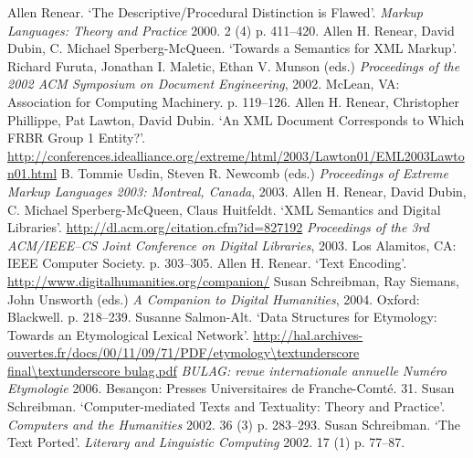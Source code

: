 \begin{bibitemlist}{1}
\label{Renear2000}Allen Renear. ‘The Descriptive/Procedural Distinction is Flawed’. \textit{Markup Languages: Theory and Practice} 2000. 2  (4)  p. 411–420. 
\label{Renearetal2002}Allen H. Renear, David Dubin, C. Michael Sperberg-McQueen. ‘Towards a Semantics for XML Markup’.  Richard Furuta, Jonathan I. Maletic, Ethan V. Munson (eds.) \textit{Proceedings of the 2002 ACM Symposium on Document Engineering}, 2002. McLean, VA: Association for Computing Machinery. p. 119–126. 
\label{Renearetal2003a}Allen H. Renear, Christopher Phillippe, Pat Lawton, David Dubin. ‘An XML Document Corresponds to Which FRBR Group 1 Entity?’.  \url{http://conferences.idealliance.org/extreme/html/2003/Lawton01/EML2003Lawton01.html} B. Tommie Usdin, Steven R. Newcomb (eds.) \textit{Proceedings of Extreme Markup Languages 2003: Montreal, Canada}, 2003. 
\label{Renearetal2003b}Allen H. Renear, David Dubin, C. Michael Sperberg-McQueen, Claus Huitfeldt. ‘XML Semantics and Digital Libraries’.  \url{http://dl.acm.org/citation.cfm?id=827192} \textit{Proceedings of the 3rd ACM/IEEE–CS Joint Conference on Digital Libraries}, 2003. Los Alamitos, CA: IEEE Computer Society. p. 303–305. 
\label{Renear2004}Allen H. Renear. ‘Text Encoding’.  \url{http://www.digitalhumanities.org/companion/} Susan Schreibman, Ray Siemans, John Unsworth (eds.) \textit{A Companion to Digital Humanities}, 2004. Oxford: Blackwell. p. 218–239. 
\label{SalmonAlt2006}Susanne Salmon-Alt. ‘Data Structures for Etymology: Towards an Etymological Lexical Network’.  \url{http://hal.archives-ouvertes.fr/docs/00/11/09/71/PDF/etymology\textunderscore final\textunderscore bulag.pdf} \textit{BULAG: revue internationale annuelle} \textit{Numéro Etymologie} 2006. Besançon: Presses Universitaires de Franche-Comté. 31. 
\label{Schreibman2002a}Susan Schreibman. ‘Computer-mediated Texts and Textuality: Theory and Practice’.  \textit{Computers and the Humanities} 2002. 36  (3)  p. 283–293. 
\label{Schreibman2002b}Susan Schreibman. ‘The Text Ported’.  \textit{Literary and Linguistic Computing} 2002. 17  (1)  p. 77–87. 

\end{bibitemlist}
